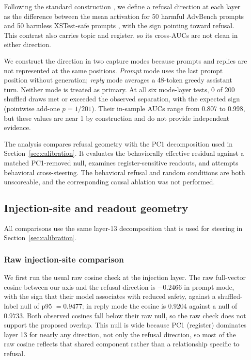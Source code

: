 Following the standard construction
\citep{arditi2024refusal}, we define a refusal direction at each layer as the
difference between the mean activation for 50 harmful AdvBench prompts
\citep{zou2023gcg} and 50 harmless XSTest-safe prompts
\citep{rottger2023xstest}, with the sign pointing toward refusal. This contrast
also carries topic and register, so its cross-AUCs are not clean in either
direction.

We construct the direction in two capture modes because prompts and replies are
not represented at the same positions. \emph{Prompt} mode uses the last prompt
position without generation; \emph{reply} mode averages a 48-token greedy
assistant turn. Neither mode is treated as primary. At all six mode-layer
tests, 0 of 200 shuffled draws met or exceeded the observed separation, with
the expected sign (pointwise add-one $p=1/201$). Their in-sample AUCs range
from 0.807 to 0.998, but these values are near 1 by construction and do not
provide independent evidence.

The analysis compares refusal geometry with the PC1 decomposition used in
Section~\ref{sec:calibration}. It evaluates the behaviorally effective residual
against a matched PC1-removed null, examines register-sensitive readouts, and
attempts behavioral cross-steering. The behavioral refusal and random
conditions are both unscoreable, and the corresponding causal ablation was not
performed.

\subsection{Injection-site and readout geometry}

All comparisons use the same layer-13 decomposition that is used for steering
in Section~\ref{sec:calibration}.

\subsubsection{Raw injection-site comparison}

We first run the usual raw cosine check at the injection layer. The raw
full-vector cosine between our axis and the refusal direction is $-0.2466$ in
prompt mode, with the sign that their model associates with reduced safety,
against a shuffled-label null of p95 $=0.9477$; in reply mode the cosine is
$0.9204$ against a null of $0.9733$. Both observed cosines fall below their
raw null, so the raw check does not support the proposed overlap. This null is
wide because PC1 (register) dominates layer 13 for nearly any direction, not
only the refusal direction, so most of the raw cosine reflects that shared
component rather than a relationship specific to refusal.

